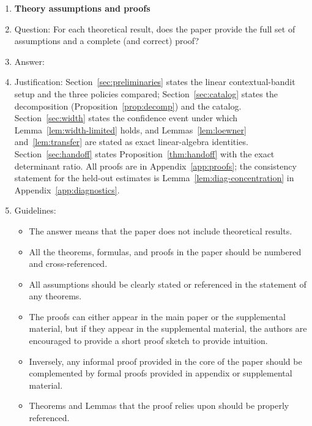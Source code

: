 \documentclass{article}
\theoremstyle{definition}
\theoremstyle{remark}
\theoremstyle{remark}
\begin{document}
\begin{enumerate}
\item {\bf Theory assumptions and proofs}
    \item[] Question: For each theoretical result, does the paper provide the full set of assumptions and a complete (and correct) proof?
    \item[] Answer: \answerYes{} %
    \item[] Justification: Section~\ref{sec:preliminaries} states the linear contextual-bandit setup and the three policies compared; Section~\ref{sec:catalog} states the decomposition (Proposition~\ref{prop:decomp}) and the catalog. Section~\ref{sec:width} states the confidence event under which Lemma~\ref{lem:width-limited} holds, and Lemmas~\ref{lem:loewner} and~\ref{lem:transfer} are stated as exact linear-algebra identities. Section~\ref{sec:handoff} states Proposition~\ref{thm:handoff} with the exact determinant ratio. All proofs are in Appendix~\ref{app:proofs}; the consistency statement for the held-out estimates is Lemma~\ref{lem:diag-concentration} in Appendix~\ref{app:diagnostics}.
    \item[] Guidelines:
    \begin{itemize}
        \item The answer \answerNA{} means that the paper does not include theoretical results. 
        \item All the theorems, formulas, and proofs in the paper should be numbered and cross-referenced.
        \item All assumptions should be clearly stated or referenced in the statement of any theorems.
        \item The proofs can either appear in the main paper or the supplemental material, but if they appear in the supplemental material, the authors are encouraged to provide a short proof sketch to provide intuition. 
        \item Inversely, any informal proof provided in the core of the paper should be complemented by formal proofs provided in appendix or supplemental material.
        \item Theorems and Lemmas that the proof relies upon should be properly referenced. 
    \end{itemize}


\end{enumerate}
\end{document}
